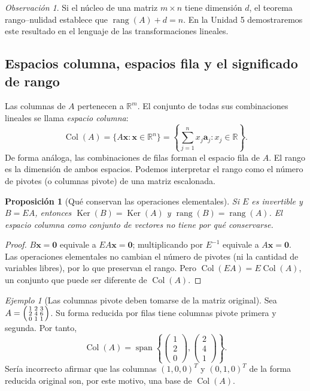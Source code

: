 \documentclass[12pt]{article}
\newtheorem{proposicion}[definicion]{Proposición}
\theoremstyle{remark}
\newtheorem{observacion}[definicion]{Observación}
\newtheorem{ejemplo}[definicion]{Ejemplo}
\newcommand{\R}{\mathbb{R}}
\newcommand{\rang}{\operatorname{rang}}
\newcommand{\Ker}{\operatorname{Ker}}
\newcommand{\vect}[1]{\boldsymbol{#1}}
\begin{document}
\begin{observacion}
Si el núcleo de una matriz $m\times n$ tiene dimensión $d$, el teorema rango--nulidad establece que $\rang(A)+d=n$. En la Unidad 5 demostraremos este resultado en el lenguaje de las transformaciones lineales.
\end{observacion}

\subsection*{Espacios columna, espacios fila y el significado de rango}
Las columnas de $A$ pertenecen a $\R^m$. El conjunto de todas sus combinaciones lineales se llama \emph{espacio columna}:
\[
\operatorname{Col}(A)=\{A\vect x:\vect x\in\R^n\}
=\left\{\sum_{j=1}^{n}x_j\vect a_j:x_j\in\R\right\}.
\]
De forma análoga, las combinaciones de filas forman el espacio fila de $A$. El rango es la dimensión de ambos espacios. Podemos interpretar el rango como el número de pivotes (o columnas pivote) de una matriz escalonada.

\begin{proposicion}[Qué conservan las operaciones elementales]
Si $E$ es invertible y $B=EA$, entonces $\Ker(B)=\Ker(A)$ y $\rang(B)=\rang(A)$. El espacio columna \emph{como conjunto de vectores} no tiene por qué conservarse.
\end{proposicion}
\begin{proof}
$B\vect x=\vect0$ equivale a $EA\vect x=\vect0$; multiplicando por $E^{-1}$ equivale a $A\vect x=\vect0$. Las operaciones elementales no cambian el número de pivotes (ni la cantidad de variables libres), por lo que preservan el rango. Pero $\operatorname{Col}(EA)=E\operatorname{Col}(A)$, un conjunto que puede ser diferente de $\operatorname{Col}(A)$.
\end{proof}
\begin{ejemplo}[Las columnas pivote deben tomarse de la matriz original]
Sea $A=\begin{psmallmatrix}1&2&3\\2&4&6\\0&1&1\end{psmallmatrix}$. Su forma reducida por filas tiene columnas pivote primera y segunda. Por tanto,
\[
\operatorname{Col}(A)=\operatorname{span}\left\{\begin{pmatrix}1\\2\\0\end{pmatrix},\begin{pmatrix}2\\4\\1\end{pmatrix}\right\}.
\]
Sería incorrecto afirmar que las columnas $(1,0,0)^T$ y $(0,1,0)^T$ de la forma reducida original son, por este motivo, una base de $\operatorname{Col}(A)$.
\end{ejemplo}
\end{document}
